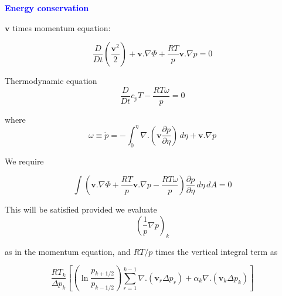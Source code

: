 \documentclass[a4]{seminar}
\newcommand{\B}[1]{\textcolor{blue}{#1}}
\begin{document}

\begin{slide}


\B{\bf Energy conservation}

\vspace{2mm}

\( \mathbf{v} \) times momentum equation:

\begin{displaymath}
\frac{D}{Dt} \left( \frac{\mathbf{v}^2}{2} \right)
+
\mathbf{v} . \nabla \Phi
+
\frac{R T}{p} \mathbf{v} . \nabla{p}
= 0
\end{displaymath}

Thermodynamic equation
\begin{displaymath}
\frac{D}{Dt} c_p T
-
\frac{R T \omega}{p}
= 0
\end{displaymath}

where
\begin{displaymath}
\omega \equiv \dot{p} =
-\int_0^\eta \nabla .
\left( \mathbf{v} \frac{\partial p}{\partial \eta} \right)
\, d \eta
+
\mathbf{v} . \nabla p
\end{displaymath}



\end{slide}


\begin{slide}

We require

\begin{displaymath}
\int \left( \mathbf{v}.\nabla \Phi + \frac{R T}{p} \mathbf{v}.\nabla p
- \frac{RT \omega}{p} \right) \frac{\partial p}{\partial \eta}
\, d \eta \, dA = 0
\end{displaymath}

This will be satisfied provided we evaluate
\begin{displaymath}
\left( \frac{1}{p} \nabla p \right)_k
\end{displaymath}

as in the momentum equation, and \( RT/p\) times the
vertical integral term as

\begin{displaymath}
\frac{R T_k}{\Delta p_k}
\left[
\left( \ln \frac{p_{k+1/2}}{p_{k-1/2}} \right)
\sum_{r=1}^{k-1} \nabla . (\mathbf{v}_r \Delta p_r )
+
\alpha_k \nabla.(\mathbf{v}_k \Delta p_k)
\right]
\end{displaymath}


\end{slide}
\end{document}
